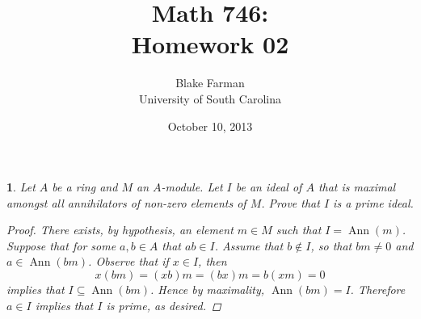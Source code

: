 \documentclass[10pt]{amsart}
\author{Blake Farman\\University of South Carolina}
\title{Math 746:\\Homework 02}
\date{October 10, 2013}
\begin{document}
\maketitle

\providecommand{\p}{\mathfrak{p}}
\providecommand{\m}{\mathfrak{m}}
\providecommand{\Ann}[1]{\operatorname{Ann}\left(#1\right)}
\newtheorem{thm}{}
\newtheorem{lem}{Lemma}

\begin{thm}
	Let $A$ be a ring and $M$ an $A$-module.
	Let $I$ be an ideal of $A$ that is maximal amongst all annihilators of non-zero elements of $M$.
	Prove that $I$ is a prime ideal.

\begin{proof}
	There exists, by hypothesis, an element $m \in M$ such that $I = \Ann{m}$.
	Suppose that for some $a, b \in A$ that $ab \in I$.
	Assume that $b \not \in I$, so that $bm \neq 0$ and $a \in \Ann{bm}$.
	Observe that if $x \in I$, then
		$$x(bm) = (xb)m = (bx)m = b(xm) = 0$$
	implies that $I \subseteq \Ann{bm}$.
	Hence by maximality, $\Ann{bm} = I$.
	Therefore $a \in I$ implies that $I$ is prime, as desired.
\end{proof}
\end{thm}
\end{document}

